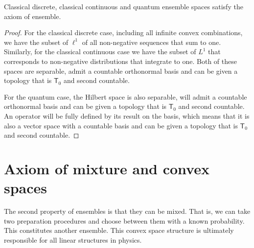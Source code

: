 \begin{prop}
	Classical discrete, classical continuous and quantum ensemble spaces satisfy the axiom of ensemble.
\end{prop}

\begin{proof}
	For the classical discrete case, including all infinite convex combinations, we have the subset of $\ell^1$ of all non-negative sequences that sum to one. Similarly, for the classical continuous case we have the subset of $L^1$ that corresponds to non-negative distributions that integrate to one. Both of these spaces are separable, admit a countable orthonormal basis and can be given a topology that is $\textsf{T}_0$ and second countable.
	
	For the quantum case, the Hilbert space is also separable, will admit a countable orthonormal basis and can be given a topology that is $\textsf{T}_0$ and second countable. An operator will be fully defined by its result on the basis, which means that it is also a vector space with a countable basis and can be given a topology that is $\textsf{T}_0$ and second countable.
\end{proof}

\section{Axiom of mixture and convex spaces}

The second property of ensembles is that they can be mixed. That is, we can take two preparation procedures and choose between them with a known probability. This constitutes another ensemble. This convex space structure is ultimately responsible for all linear structures in physics.

